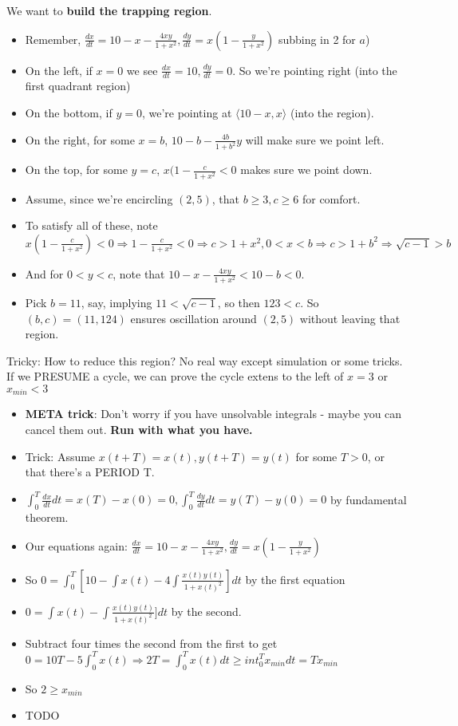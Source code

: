 \documentclass[11pt, oneside]{article}   	%
\begin{document}
We want to \textbf{build the trapping region}.   
\begin{itemize}
\item Remember, $\frac{dx}{dt} = 10 - x - \frac{4xy}{1+x^2}, \frac{dy}{dt} = x(1 - \frac{y}{1+x^2})$ subbing in 2 for $a$)
\item On the left, if $x = 0$ we see $\frac{dx}{dt} = 10, \frac{dy}{dt}  = 0$.  So we're pointing right (into the first quadrant region)
\item On the bottom, if $y = 0$, we're pointing at $\langle 10 -x , x \rangle$ (into the region).
\item On the right, for some $x = b$, $10 - b - \frac{4b}{1+b^2}y$ will make sure we point left.
\item On the top, for some $y = c$, $x(1-\frac{c}{1+x^2} < 0$ makes sure we point down.
\item Assume, since we're encircling $(2,5)$, that $b \geq 3, c \geq 6$ for comfort.
\item To satisfy all of these, note $x(1-\frac{c}{1+x^2}) < 0 \Rightarrow 1 - \frac{c}{1+x^2} < 0 \Rightarrow c > 1+x^2, 0 < x < b \Rightarrow c > 1+b^2 \Rightarrow  \sqrt{c - 1 } > b $ 
\item And for $0 < y < c$, note that $10 - x - \frac{4xy}{1+x^2} < 10 - b < 0. $ 
\item Pick $b = 11$, say, implying $11 < \sqrt{c-1}$, so then $123 < c$.  So $(b,c) = (11, 124)$ ensures oscillation around $(2,5)$ without leaving that region.
\end{itemize}

Tricky: How to reduce this region?  No real way except simulation or some tricks.   If we PRESUME a cycle, we can prove the cycle extens to the left of $x=3$ or $ x_{min} < 3$
\begin{itemize}
\item \textbf{META trick}: Don't worry if you have unsolvable integrals - maybe you can cancel them out.  \textbf{Run with what you have.}
\item Trick: Assume $x(t + T) = x(t), y(t + T) = y(t)$ for some $T>0$, or that there's a PERIOD T.
\item $\int_0^T \frac{dx}{dt}dt = x(T) - x(0) = 0, \int_0^T \frac{dy}{dt}dt = y(T) - y(0) = 0$ by fundamental theorem.
\item Our equations again:  $\frac{dx}{dt} = 10 - x - \frac{4xy}{1+x^2}, \frac{dy}{dt} = x(1 - \frac{y}{1+x^2})$
\item So $0 = \int_0^T [10 - \int x(t) - 4\int \frac{x(t)y(t)} {1+x(t)^2}]dt$ by the first equation
\item $0 = \int x(t) - \int \frac{x(t)y(t)} {1+x(t)^2}]dt$ by the second.
\item Subtract four times the second from the first to get $0 = 10T - 5 \int_0^T x(t) \Rightarrow 2T = \int_0^T x(t)dt \geq int_0^T x_{min}dt = Tx_{min}$
\item So $2 \geq x_{min}$
\end{itemize}



\begin{itemize}
\item TODO
\end{itemize}
\end{document}
